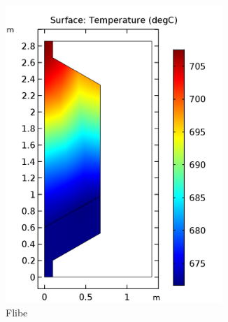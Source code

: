 \documentclass{elsarticle}
\begin{document}
\begin{figure}[h]
  \centering
    \begin{subfigure}[b]{0.3\textwidth}
        \centering
        \includegraphics[width=0.9\textwidth]{./images/diffusion/tmsr/SS/ms/T_flibe(steady_state).png}
        \caption{Flibe}
    \end{subfigure}%
    ~
    \begin{subfigure}[b]{0.3\textwidth}
        \centering

\end{subfigure}
\end{figure}
\end{document}
